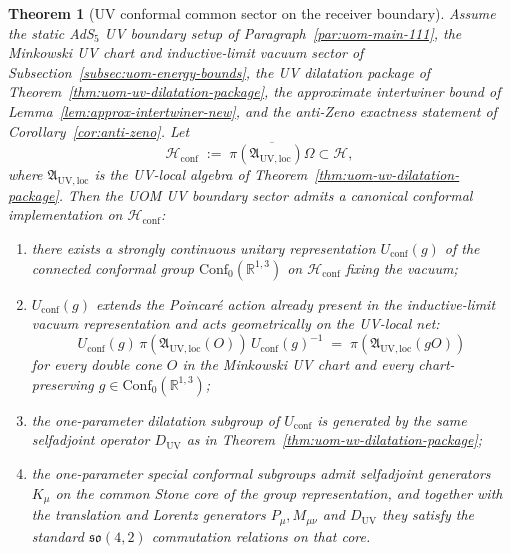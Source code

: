 \documentclass[10pt]{article}
\theoremstyle{definition}
\theoremstyle{plain}
\newtheorem{theorem}{Theorem}[section]
\begin{document}
\begin{theorem}[UV conformal common sector on the receiver boundary]
\label{thm:uom-uv-conformal-common-sector}
Assume the static AdS$_5$ UV boundary setup of
Paragraph~\ref{par:uom-main-111}, the Minkowski UV chart and
inductive-limit vacuum sector of
Subsection~\ref{subsec:uom-energy-bounds}, the UV dilatation package of
Theorem~\ref{thm:uom-uv-dilatation-package}, the approximate
intertwiner bound of Lemma~\ref{lem:approx-intertwiner-new}, and the
anti-Zeno exactness statement of Corollary~\ref{cor:anti-zeno}.  Let
\[
\mathcal H_{\mathrm{conf}}
\;:=\;
\overline{\pi(\mathfrak A_{\mathrm{UV,loc}})\Omega}
\subset \mathcal H,
\]
where \(\mathfrak A_{\mathrm{UV,loc}}\) is the UV-local algebra of
Theorem~\ref{thm:uom-uv-dilatation-package}.  Then the UOM UV boundary
sector admits a canonical conformal implementation on
\(\mathcal H_{\mathrm{conf}}\):
\begin{enumerate}[label=\textnormal{(\roman*)},leftmargin=2.2em,itemsep=2pt]
\item there exists a strongly continuous unitary representation
  \(U_{\mathrm{conf}}(g)\) of the connected conformal group
  \(\mathrm{Conf}_0(\mathbb R^{1,3})\) on \(\mathcal H_{\mathrm{conf}}\)
  fixing the vacuum;
\item \(U_{\mathrm{conf}}(g)\) extends the Poincar\'e action already
  present in the inductive-limit vacuum representation and acts
  geometrically on the UV-local net:
  \[
  U_{\mathrm{conf}}(g)\,\pi(\mathfrak A_{\mathrm{UV,loc}}(O))\,U_{\mathrm{conf}}(g)^{-1}
  \;=\;
  \pi(\mathfrak A_{\mathrm{UV,loc}}(gO))
  \]
  for every double cone \(O\) in the Minkowski UV chart and every
  chart-preserving \(g\in\mathrm{Conf}_0(\mathbb R^{1,3})\);
\item the one-parameter dilatation subgroup of \(U_{\mathrm{conf}}\) is
  generated by the same selfadjoint operator \(D_{\mathrm{UV}}\) as in
  Theorem~\ref{thm:uom-uv-dilatation-package};
\item the one-parameter special conformal subgroups admit selfadjoint
  generators \(K_\mu\) on the common Stone core of the group
  representation, and together with the translation and Lorentz
  generators \(P_\mu,M_{\mu\nu}\) and \(D_{\mathrm{UV}}\) they satisfy
  the standard \(\mathfrak{so}(4,2)\) commutation relations on that
  core.
\end{enumerate}
\end{theorem}
\end{document}
